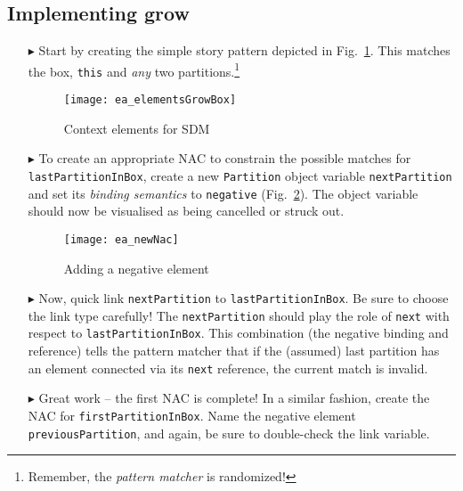 \newpage
\hypertarget{growBox vis}{}
\subsection{Implementing grow}
\visHeader

\begin{itemize}
 
\item[$\blacktriangleright$] Start by creating the simple story pattern depicted in Fig.~\ref{fig:sdm_grow_1}. This matches the box, \texttt{this} and 
\emph{any} two partitions.\footnote{Remember, the \emph{pattern matcher} is randomized!}

\vspace{0.5cm}

\begin{figure}[htbp]
\begin{center}
  \texttt{[image: ea\_elementsGrowBox]}
  \caption{Context elements for SDM}  
  \label{fig:sdm_grow_1}
\end{center}
\end{figure}

\item[$\blacktriangleright$] To create an appropriate \mbox{NAC} to constrain the possible matches for \texttt{lastPartitionInBox},  create a new
\texttt{Partition} object variable \texttt{next\-Part\-ition} and set its \emph{binding semantics} to \texttt{negative} (Fig.~\ref{fig:sdm_grow_2}). The object
variable should now be visualised as being cancelled or struck out.
 
\begin{figure}[htbp]
\begin{center}
  \texttt{[image: ea\_newNac]}
  \caption{Adding a negative element}  
  \label{fig:sdm_grow_2}
\end{center}
\end{figure}
 
\item[$\blacktriangleright$] Now, quick link \texttt{nextPartition} to \texttt{lastPartitionInBox}. Be sure to choose the link type carefully! The
\texttt{nextPartition} should play the role of \texttt{next} with respect to \texttt{lastPartitionInBox}. This combination (the negative binding and reference)
tells the pattern matcher that if the (assumed) last partition has an element connected via its \texttt{next} reference, the current match is invalid.

\item[$\blacktriangleright$] Great work -- the first NAC is complete! In a similar fashion, create the NAC for \texttt{firstPartitionInBox}. Name the
negative element \texttt{previousPartition}, and again, be sure to double-check the link variable.


\end{itemize}
